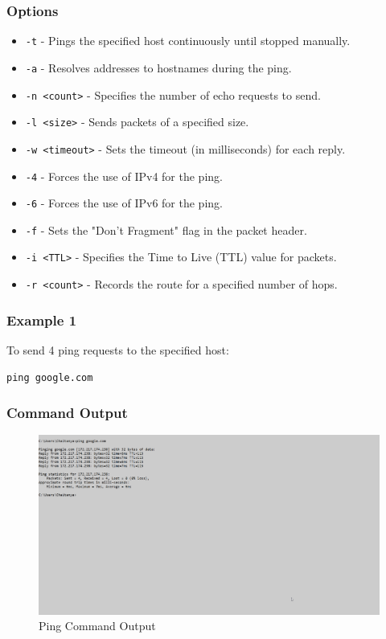 \documentclass{article}
\begin{document}
\subsubsection{Options}
\begin{itemize}
    \item \texttt{-t} - Pings the specified host continuously until stopped manually.
    \item \texttt{-a} - Resolves addresses to hostnames during the ping.
    \item \texttt{-n \textless count\textgreater} - Specifies the number of echo requests to send.
    \item \texttt{-l \textless size\textgreater} - Sends packets of a specified size.
    \item \texttt{-w \textless timeout\textgreater} - Sets the timeout (in milliseconds) for each reply.
    \item \texttt{-4} - Forces the use of IPv4 for the ping.
    \item \texttt{-6} - Forces the use of IPv6 for the ping.
    \item \texttt{-f} - Sets the "Don't Fragment" flag in the packet header.
    \item \texttt{-i \textless TTL\textgreater} - Specifies the Time to Live (TTL) value for packets.
    \item \texttt{-r \textless count\textgreater} - Records the route for a specified number of hops.
\end{itemize}

\subsubsection{Example 1}
To send 4 ping requests to the specified host:
\begin{verbatim}
ping google.com
\end{verbatim}



\subsubsection{Command Output}
\begin{figure}[htbp]
    \centering
    \includegraphics[]{ping.png}
    \caption{Ping Command Output}
    \label{fig:ping_output}
\end{figure}
\end{document}
